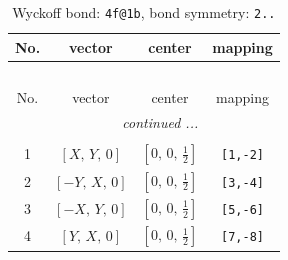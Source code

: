 \documentclass[fleqn,8pt]{jsarticle}
\begin{document}
\renewcommand{\arraystretch}{1.2}
\begin{longtable}{cccc}
\caption{Wyckoff bond: {\tt 4f@1b}, bond symmetry: {\tt 2..}}
 \\
 \hline \hline
No. & vector & center & mapping \\ \hline \endfirsthead

\multicolumn{3}{l}{\tablename\ \thetable{}} \\
 \hline \hline
No. & vector & center & mapping \\ \hline \endhead

 \hline \hline
\multicolumn{3}{r}{\footnotesize\it continued ...} \\ \endfoot

 \hline \hline
\multicolumn{3}{r}{} \\ \endlastfoot

1 & $\left[ X,\, Y,\, 0 \right]$ & $\left[ 0,\, 0,\, \frac{1}{2} \right]$ & {\tt [1,-2]} \\ \hline
2 & $\left[ - Y,\, X,\, 0 \right]$ & $\left[ 0,\, 0,\, \frac{1}{2} \right]$ & {\tt [3,-4]} \\ \hline
3 & $\left[ - X,\, Y,\, 0 \right]$ & $\left[ 0,\, 0,\, \frac{1}{2} \right]$ & {\tt [5,-6]} \\ \hline
4 & $\left[ Y,\, X,\, 0 \right]$ & $\left[ 0,\, 0,\, \frac{1}{2} \right]$ & {\tt [7,-8]} \\
\end{longtable}
\renewcommand{\arraystretch}{1.2}
\end{document}
